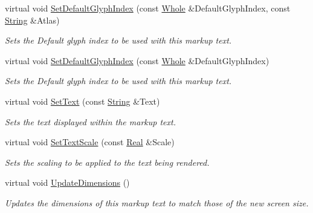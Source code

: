 \begin{DoxyCompactItemize}
virtual void \hyperlink{classMezzanine_1_1UI_1_1MarkupText_a2cff9446978935a555fafdc0795de517}{SetDefaultGlyphIndex} (const \hyperlink{namespaceMezzanine_adcbb6ce6d1eb4379d109e51171e2e493}{Whole} \&DefaultGlyphIndex, const \hyperlink{namespaceMezzanine_acf9fcc130e6ebf08e3d8491aebcf1c86}{String} \&Atlas)
\begin{DoxyCompactList}\small\item\em Sets the Default glyph index to be used with this markup text. \item\end{DoxyCompactList}\item 
virtual void \hyperlink{classMezzanine_1_1UI_1_1MarkupText_a8455dbc85e8ed56f366c14f1cab24f49}{SetDefaultGlyphIndex} (const \hyperlink{namespaceMezzanine_adcbb6ce6d1eb4379d109e51171e2e493}{Whole} \&DefaultGlyphIndex)
\begin{DoxyCompactList}\small\item\em Sets the Default glyph index to be used with this markup text. \item\end{DoxyCompactList}\item 
virtual void \hyperlink{classMezzanine_1_1UI_1_1MarkupText_aaf712f1b14c1daa74493a7157d1ca789}{SetText} (const \hyperlink{namespaceMezzanine_acf9fcc130e6ebf08e3d8491aebcf1c86}{String} \&Text)
\begin{DoxyCompactList}\small\item\em Sets the text displayed within the markup text. \item\end{DoxyCompactList}\item 
virtual void \hyperlink{classMezzanine_1_1UI_1_1MarkupText_a72af2f6757e01ede3cc6a19b3021c178}{SetTextScale} (const \hyperlink{namespaceMezzanine_a726731b1a7df72bf3583e4a97282c6f6}{Real} \&Scale)
\begin{DoxyCompactList}\small\item\em Sets the scaling to be applied to the text being rendered. \item\end{DoxyCompactList}\item 
virtual void \hyperlink{classMezzanine_1_1UI_1_1MarkupText_a3a7e102a8b5b3217526ce183465ed69e}{UpdateDimensions} ()
\begin{DoxyCompactList}\small\item\em Updates the dimensions of this markup text to match those of the new screen size. \item\end{DoxyCompactList}\end{DoxyCompactItemize}
